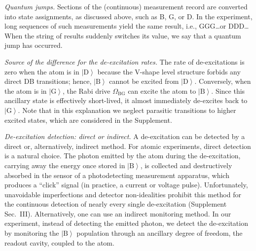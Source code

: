 \documentclass[
	 			preprint,     		superscriptaddress, 																longbibliography,
		amsmath, amssymb,
		aps,  prb,   		floatfix,
		linenumbers     
	]{revtex4-1}
\newcommand{\ket}[1]{\left|#1\right>}
\begin{document}
\textit{Quantum jumps.} 
Sections of the (continuous) measurement record are converted into state assignments, as discussed above, such as B, G, or D.
In the experiment, long sequences of such measurements yield the same result, i.e., GGG\ldots or DDD\ldots 
When the string of results suddenly switches its value, we say that a quantum jump has occurred.

\textit{Source of the difference for the de-excitation rates.}
The rate of de-excitations is zero when the atom is in $\ket{\mathrm{D}}$ because the V-shape level structure forbids any direct DB transitions; hence,  $\ket{\mathrm{B}}$ cannot be excited from $\ket{\mathrm{D}}$. 
Conversely, when the atom is in $\ket{\mathrm{G}}$, the Rabi drive $\Omega_\mathrm{BG}$ can excite the atom to $\ket{\mathrm{B}}$. Since this ancillary state is effectively short-lived, it almost immediately de-excites back to $\ket{\mathrm{G}}$. 
Note that in this explanation we neglect parasitic transitions to higher excited states, which are considered in the Supplement. 


\textit{De-excitation detection: direct or indirect.}
A de-excitation can be detected by a direct or, alternatively, indirect method. 
For atomic experiments, direct detection is a natural choice. 
The photon emitted by the atom during the de-excitation, carrying away the energy once stored in $\ket{\mathrm{B}}$,  is collected and destructively absorbed in the sensor of a photodetecting measurement apparatus, which produces a ``click'' signal (in practice, a current or voltage pulse).
Unfortunately, unavoidable imperfections and detector non-idealities  prohibit this method for the continuous detection of nearly every single de-excitation (Supplement Sec.~III).
Alternatively, one can use an indirect monitoring method.
In our experiment, instead of detecting the emitted photon, we  detect the  de-excitation by monitoring the $\ket{\mathrm{B}}$ population through an ancillary degree of freedom, the readout cavity, coupled to the atom. 
\end{document}
